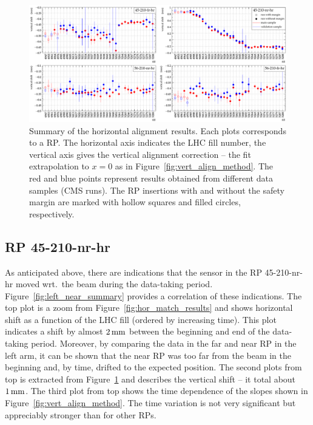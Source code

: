 \documentclass[TOTEM]{cern/cernphprep}
\def\un#1{\,{\rm #1}}
\begin{document}
\begin{figure}[h!]
\begin{center}
\includegraphics[width=\hsize]{fig/physics_fills/final_alignment_y_cmp_ph_sample.pdf}
\caption{%
Summary of the horizontal alignment results. Each plots corresponds to a RP. The horizontal axis indicates the LHC fill number, the vertical axis gives the vertical alignment correction -- the fit extrapolation to $x=0$ as in Figure~\ref{fig:vert_align_method}. The red and blue points represent results obtained from different data samples (CMS runs). The RP insertions with and without the safety margin are marked with hollow squares and filled circles, respectively.
}
\label{fig:vert_align_results}
\end{center}
\end{figure}



\subsection{RP 45-210-nr-hr}
\label{s:phys-left-near}

As anticipated above, there are indications that the sensor in the RP 45-210-nr-hr moved wrt.~the beam during the data-taking period. Figure~\ref{fig:left_near_summary} provides a correlation of these indications. The top plot is a zoom from Figure~\ref{fig:hor_match_results} and shows horizontal shift as a function of the LHC fill (ordered by increasing time). This plot indicates a shift by almost $2\un{mm}$ between the beginning and end of the data-taking period. Moreover, by comparing the data in the far and near RP in the left arm, it can be shown that the near RP was too far from the beam in the beginning and, by time, drifted to the expected position. The second plots from top is extracted from Figure~\ref{fig:vert_align_results} and describes the vertical shift -- it total about $1\un{mm}$. The third plot from top shows the time dependence of the slopes shown in Figure~\ref{fig:vert_align_method}. The time variation is not very significant but appreciably stronger than for other RPs.
\end{document}
